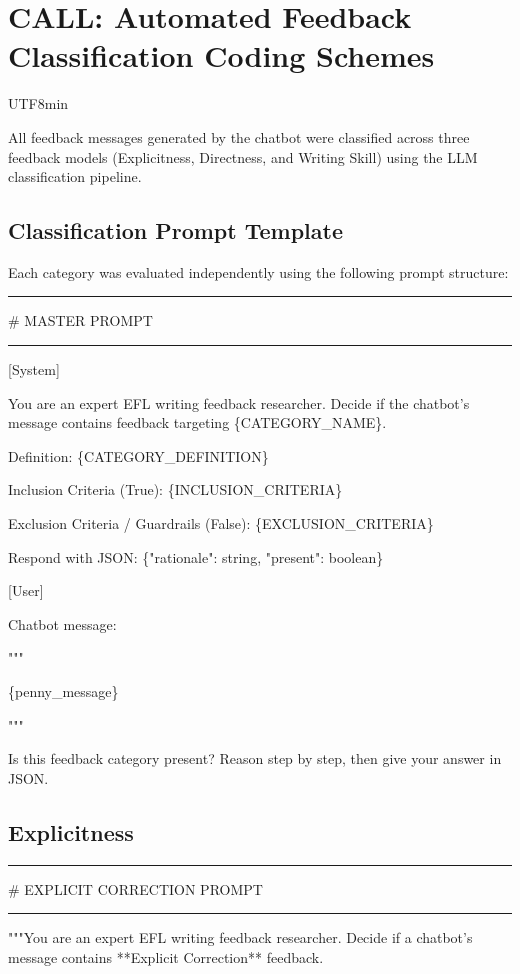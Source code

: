 \chapter{CALL: Automated Feedback Classification Coding Schemes}\label{app:call_coding}
\begin{CJK}{UTF8}{min}

All feedback messages generated by the chatbot were classified across three feedback models (Explicitness, Directness, and Writing Skill) using the LLM classification pipeline.

\section{Classification Prompt Template}

Each category was evaluated independently using the following prompt structure:

\medskip\hrule\medskip

\# MASTER PROMPT

\medskip\hrule\medskip

{[}System{]}

You are an expert EFL writing feedback researcher. Decide if the chatbot's message contains feedback targeting \{CATEGORY\_NAME\}.

Definition: \{CATEGORY\_DEFINITION\}

Inclusion Criteria (True): \{INCLUSION\_CRITERIA\}

Exclusion Criteria / Guardrails (False): \{EXCLUSION\_CRITERIA\}

Respond with JSON: \{"rationale": string, "present": boolean\}

{[}User{]}

Chatbot message:

"""

\{penny\_message\}

"""

Is this feedback category present? Reason step by step, then give your answer in JSON.

\section{Explicitness}

\medskip\hrule\medskip

\# EXPLICIT CORRECTION PROMPT

\medskip\hrule\medskip

"""You are an expert EFL writing feedback researcher. Decide if a chatbot's message contains **Explicit Correction** feedback.


\end{CJK}
